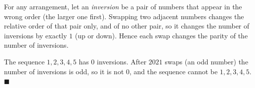 For any arrangement, let an \emph{inversion} be a pair of numbers that appear in the wrong order (the larger one first). Swapping two adjacent numbers changes the relative order of that pair only, and of no other pair, so it changes the number of inversions by exactly $1$ (up or down). Hence each swap changes the parity of the number of inversions.

The sequence $1,2,3,4,5$ has $0$ inversions. After $2021$ swaps (an odd number) the number of inversions is odd, so it is not $0$, and the sequence cannot be $1,2,3,4,5$. $\blacksquare$
